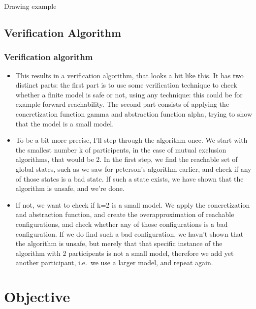 \documentclass[handout]{beamer}
\begin{document}
\begin{footnotesize}
\begin{frame}
Drawing example
\end{frame}

\subsection{Verification Algorithm}
\begin{frame}
  \frametitle{Verification algorithm} %
\begin{itemize}
\item
This results in a verification algorithm, that looks a bit like this. It has two distinct parts: the first part is to use some verification technique to check whether a finite model is safe or not, using any technique: this could be for example forward reachability. The second part consists of applying the concretization function gamma and abstraction function alpha, trying to show that the model is a small model.
\item
To be a bit more precise, I'll step through the algorithm once. We start with the smallest number k of participents, in the case of mutual exclusion algorithms, that would be 2.  In the first step, we find the reachable set of global states, such as we saw for peterson's algorithm earlier, and check if any of those states is a bad state. If such a state exists, we have shown that the algorithm is unsafe, and we're done.
\item
If not, we want to check if k=2 is a small model. We apply the concretization and abstraction function, and create the overapproximation of reachable configurations, and check whether any of those configurations is a bad configuration. If we do find such a bad configuration, we havn't shown that the algorithm is unsafe, but merely that that specific instance of the algorithm with 2 participents is not a small model, therefore we add yet another participant, i.e.\ we use a larger model, and repeat again.
\end{itemize}

\end{frame}

\section{Objective}

\end{footnotesize}
\end{document}
